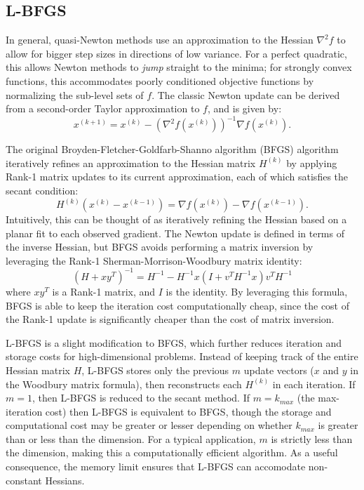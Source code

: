 \documentclass[letterpaper, 10 pt, conference]{IEEEtran}  %
\begin{document}
\subsection{L-BFGS}

In general, quasi-Newton methods use an approximation to the Hessian
$\nabla^2 f$ to allow for bigger step sizes in directions of low
variance.  For a perfect quadratic, this allows Newton methods to
\textit{jump} straight to the minima; for strongly convex functions,
this accommodates poorly conditioned objective functions by normalizing
the sub-level sets of $f$.  The classic Newton update can be derived
from a second-order Taylor approximation to $f$, and is given by:
$$ x^{(k+1)} = x^{(k)} - \left(\nabla^2 f(x^{(k)})\right)^{-1}\nabla f(x^{(k)}). $$

The original Broyden-Fletcher-Goldfarb-Shanno algorithm (BFGS)
algorithm iteratively refines an approximation to the Hessian matrix
$H^{(k)}$ by applying Rank-1 matrix updates to its current
approximation, each of which satisfies the secant condition:
$$ H^{(k)}\left(x^{(k)}-x^{(k-1)}\right) = \nabla f(x^{(k)}) - \nabla f(x^{(k-1)}).$$
Intuitively, this can be thought of as iteratively refining the
Hessian based on a planar fit to each observed gradient.  The Newton
update is defined in terms of the inverse Hessian, but BFGS avoids
performing a matrix inversion by leveraging the Rank-1
Sherman-Morrison-Woodbury matrix identity:
$$(H + xy^T)^{-1} = H^{-1} - H^{-1}x(I + v^T H^{-1}x)v^T H^{-1}$$
where $xy^T$ is a Rank-1 matrix, and $I$ is the identity.  By
leveraging this formula, BFGS is able to keep the iteration cost
computationally cheap, since the cost of the Rank-1 update is
significantly cheaper than the cost of matrix inversion.

L-BFGS \cite{nocedal1980updating,liu1989limited} is a slight
modification to BFGS, which further reduces iteration and storage
costs for high-dimensional problems.  Instead of keeping track of the
entire Hessian matrix $H$, L-BFGS stores only the previous $m$ update
vectors ($x$ and $y$ in the Woodbury matrix formula), then
reconstructs each $H^{(k)}$ in each iteration.  If $m=1$, then L-BFGS
is reduced to the secant method.  If $m=k_{max}$ (the max-iteration
cost) then L-BFGS is equivalent to BFGS, though the storage and
computational cost may be greater or lesser depending on whether
$k_{max}$ is greater than or less than the dimension.  For a typical
application, $m$ is strictly less than the dimension, making this a
computationally efficient algorithm.  As a useful consequence, the
memory limit ensures that L-BFGS can accomodate non-constant Hessians.
\end{document}
